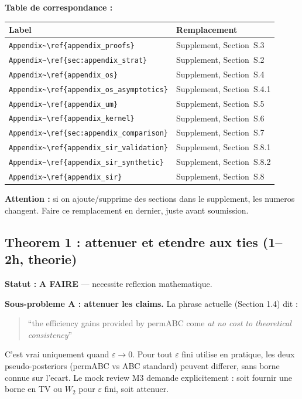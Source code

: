 \documentclass[11pt]{article}
\newcommand{\todo}{\textcolor{todo}{\textbf{A FAIRE}}}
\begin{document}
\textbf{Table de correspondance :}

\begin{center}
\begin{tabular}{ll}
\toprule
\textbf{Label} & \textbf{Remplacement} \\
\midrule
\verb|Appendix~\ref{appendix_proofs}| & Supplement, Section~S.3 \\
\verb|Appendix~\ref{sec:appendix_strat}| & Supplement, Section~S.2 \\
\verb|Appendix~\ref{appendix_os}| & Supplement, Section~S.4 \\
\verb|Appendix~\ref{appendix_os_asymptotics}| & Supplement, Section~S.4.1 \\
\verb|Appendix~\ref{appendix_um}| & Supplement, Section~S.5 \\
\verb|Appendix~\ref{appendix_kernel}| & Supplement, Section~S.6 \\
\verb|Appendix~\ref{sec:appendix_comparison}| & Supplement, Section~S.7 \\
\verb|Appendix~\ref{appendix_sir_validation}| & Supplement, Section~S.8.1 \\
\verb|Appendix~\ref{appendix_sir_synthetic}| & Supplement, Section~S.8.2 \\
\verb|Appendix~\ref{appendix_sir}| & Supplement, Section~S.8 \\
\bottomrule
\end{tabular}
\end{center}

\textbf{Attention :} si on ajoute/supprime des sections dans le supplement, les numeros changent. Faire ce remplacement en dernier, juste avant soumission.

\subsection{Theorem 1 : attenuer et etendre aux ties (1--2h, theorie)}
\label{sec:thm1}

\textbf{Statut :} \todo{} --- necessite reflexion mathematique.

\textbf{Sous-probleme A : attenuer les claims.} La phrase actuelle (Section 1.4) dit :
\begin{quote}
``the efficiency gains provided by permABC come \emph{at no cost to theoretical consistency}''
\end{quote}
C'est vrai uniquement quand $\varepsilon \to 0$. Pour tout $\varepsilon$ fini utilise en pratique, les deux pseudo-posteriors (permABC vs ABC standard) peuvent differer, sans borne connue sur l'ecart. Le mock review M3 demande explicitement : soit fournir une borne en TV ou $W_2$ pour $\varepsilon$ fini, soit attenuer.
\end{document}

